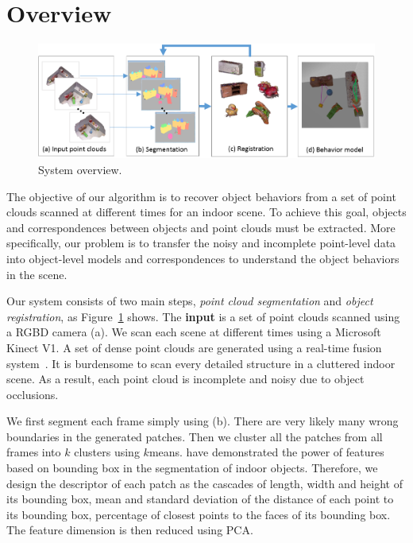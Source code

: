 \section{Overview}
\label{sec:overview}

\begin{figure}
	\includegraphics[width=1.0\textwidth]{figures/overview.png}
	\caption{System overview.}
	\label{fig:overview}
\end{figure}

The objective of our algorithm is to recover object behaviors from a set of point clouds scanned at different times for an indoor scene.
%
To achieve this goal, objects and correspondences between objects and point clouds must be extracted. 
%
More specifically, our problem is to transfer the noisy and incomplete point-level data into object-level models and correspondences to understand the object behaviors in the scene.
%


Our system consists of two main steps, \emph{point cloud segmentation} and \emph{object registration}, as Figure~\ref{fig:overview} shows. 
The \textbf{input} is a set of point clouds scanned using a RGBD camera (a). 
We scan each scene at different times  using a Microsoft Kinect V1. A set of dense point clouds are generated using a real-time fusion system~\cite{NieBner:2013:VoxelHashing}. 
%
It is burdensome to scan every detailed structure in a cluttered indoor scene. As a result, each point cloud is incomplete and noisy due to object occlusions.



We first segment each frame simply using  (b).
There are very likely many wrong boundaries in the generated patches.
Then we cluster all the patches from all frames into $k$ clusters using $k$means. 
%
\cite{Jia20153D} have demonstrated the power of features based on bounding box in the segmentation of indoor objects.
Therefore, we design the descriptor of each patch as the cascades of length, width and height of its bounding box, mean and standard deviation of the distance of each point to its bounding box, percentage of closest points to the faces of its bounding box.  
The feature dimension is then reduced using PCA. 



